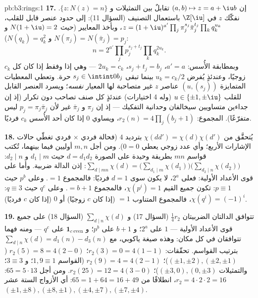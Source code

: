 \begin{solution}{pb:b3:rings:1}
\textbf{17.} إن $(a, b) \mapsto z = a + \iu b$ تقابلٌ بين التمثيلات و $\{z : N(z) = n\}$. نفكّك
$z$ في  $\Z[\iu]$ باستعمال التصنيف (السؤال
11): إلى حدود عنصر قابل للقلب، $z = (1+\iu)^{a'}\prod_j\pi_j^{s_j}\bar\pi_j^{t_j}
\prod_kq_k^{u_k}$، وبأخذ المعايير (حيث
$N(1+\iu) = 2$ و $N(\pi_j) = N(\bar\pi_j) = p_j$ و $N(q_k) = q_k^2$):
\[
n = 2^{a'}\prod_jp_j^{s_j + t_j}\prod_kq_k^{2u_k} .
\]
وبمطابقة الأُسس: $a' = a$، $s_j + t_j = b_j$، $2u_k = c_k$ --- وهي  إذا وفقط إذا كان كل $c_k$ زوجيًا، وعندئذٍ يُفرض
$u_k = c_k/2$ بينما تبقى $s_j \in \intint0{b_j}$ حرة. وتعطي المعطيات المتمايزة
$(u, (s_j))$ عناصر $z$ غير متصاحبة لها المعيار \emph{نفسه}؛
ويسرد العنصر القابل للقلب $u \in \{\pm1, \pm\iu\}$ (وله 4 اختيارات) عندئذٍ كل
صنف تصاحب دون تكرار (إذ إن جداءين متساويين سيخالفان وحدانية
التفكيك --- إذ إن $\pi_j$ و $\bar\pi_j$ غير  لأن $p_j =
\pi_j\bar\pi_j$
ليس متفرّعًا). المجموع: $r_2(n) =
4\prod_j(b_j + 1)$، ويساوي $0$ إذا كان أحد
الأُسس $c_k$ فرديًا.

\textbf{18.} يُتحقَّق من $\chi(dd') = \chi(d)\chi(d')$ بترديد $4$ (فحالة فردي
$\times$ فردي تغطّي حالات الإشارات الأربع؛ وأي عدد زوجي يعطي
$0 = 0$). ومن أجل $m, n$ أوليين فيما بينهما، تُكتب قواسم $mn$
بطريقة وحيدة على الصورة $d = d_1d_2$ حيث $d_1 \mid m$
و $d_2 \mid n$: $\sum_{d \mid mn}\chi(d) = \bigl(\sum_{d_1\mid
m}\chi(d_1)\bigr)\bigl(\sum_{d_2\mid n}\chi(d_2)\bigr)$: إذن الدالة ضربية. وأما على قوى الأعداد
الأولية: فعلى $2^a$، لا يكون سوى $d = 1$ فرديًا: فالمجموع $= 1$.
وعلى $p^b$ حيث $p \equiv 1$: تكون جميع القيم $\chi(p^i) = 1$،
فالمجموع $= b + 1$. وعلى $q^c$ حيث $q \equiv 3$: $\chi(q^i) =
(-1)^i$،
فالمجموع المتناوب $= 1$ (إذا كان $c$ زوجيًا) أو $0$ (إذا كان
$c$ فرديًا).

\textbf{19.} تتوافق الدالتان الضربيتان $\frac14r_2$ (السؤال 17)
و $\sum_{d\mid n}\chi(d)$ (السؤال 18) على جميع قوى الأعداد الأولية --- $1$
على $2^a$؛ و $b + 1$ على $p^b$؛ و $\mathbf 1_{c\ \mathrm{even}}$ على $q^c$ --- ومنه
فهما تتوافقان في كل مكان: وهذه صيغة ياكوبي، مع $\sum_{d\mid
n}\chi(d) = d_1(n) - d_3(n)$ بترتيب
القواسم. تحقّقات: $r_2(3) = 0 = 4(1 - 1)$؛ $r_2(5) = 8 = 4(2 - 0)$ ($(\pm1,\pm2), (\pm2,\pm1)$)؛ $r_2(9) = 4 = 4(2 - 1)$ (القواسم
$1, 9 \equiv 1$؛ و $3 \equiv 3$؛ والتمثيلات $(\pm3, 0), (0, \pm3)$)؛ $r_2(25) = 12 = 4(3 - 0)$.
ومن أجل $65 =
5\cdot13$: $r_2 = 4\cdot2\cdot2 = 16$، انطلاقًا من $65 = 1 + 64 = 16
+ 49$: أي الأزواج
الستة عشر $(\pm1, \pm8), (\pm8, \pm1), (\pm4,
\pm7), (\pm7, \pm4)$.


\end{solution}
